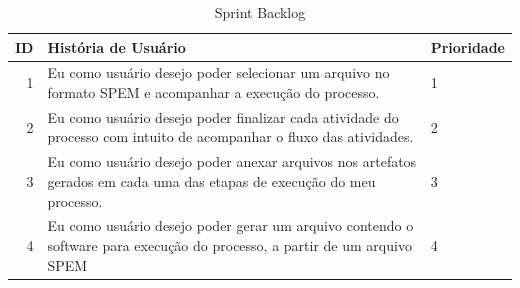 \begin{table}[!htb]
	\centering
	\caption{Sprint Backlog}
		\label{sprintbacklog}
	\vspace{0.5cm}
	\begin{tabular}{r|p{11cm}|p{2cm}}
		
		ID & História de Usuário & Prioridade \\ %
		\hline                               %
		1 & Eu como usuário desejo poder selecionar um arquivo no formato SPEM e acompanhar a execução do processo.        & 1 \\
				\hline 
		2 & Eu como usuário desejo poder finalizar cada atividade do processo com intuito de acompanhar o fluxo das atividades.  & 2 \\
				\hline 
		3 & Eu como usuário desejo poder anexar arquivos nos artefatos gerados em cada uma das etapas de execução do meu processo.           & 3 \\
				\hline 
		4 & Eu como usuário desejo poder gerar um arquivo contendo o software para execução do processo, a partir de um arquivo SPEM        & 4 \\         %
		
	\end{tabular}
\end{table}


		

